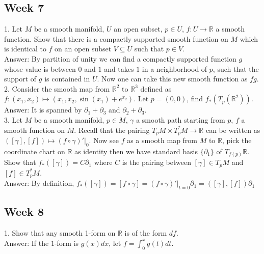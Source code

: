 \documentclass{article}
\theoremstyle{definition}
\begin{document}
\newpage

\subsection{Week 7}

1. Let $M$ be a smooth manifold, $U$ an open subset, $p\in U$, $f: U\rightarrow \mathbb{R}$ a smooth function. Show that there is a compactly supported smooth function on $M$ which is identical to $f$ on an open subset $V\subseteq U$ such that $p\in V$.\\

Answer: By partition of unity we can find a compactly supported function $g$ whose value is between $0$ and $1$ and takes $1$ in a neighborhood of $p$, such that the support of $g$ is contained in $U$. Now one can take this new smooth function as $fg$.\\

2. Consider the smooth map from $\mathbb{R}^2$ to $\mathbb{R}^3$ defined as $f: (x_1, x_2)\mapsto (x_1, x_2, \sin(x_1)+e^{x_2})$. Let $p=(0, 0)$, find $f_*(T_p(\mathbb{R}^2))$.\\

Answer: It is spanned by $\partial_1+\partial_3$ and $\partial_2+\partial_3$.\\

3. Let $M$ be a smooth manifold, $p\in M$, $\gamma$ a smooth path starting from $p$, $f$ a smooth function on $M$. Recall that the pairing $T_pM\times T^*_pM\rightarrow \mathbb{R}$ can be written as $([\gamma], [f])\mapsto (f\circ \gamma)'|_0$. Now see $f$ as a smooth map from $M$ to $\mathbb{R}$, pick the coordinate chart on $\mathbb{R}$ as identity then we have standard basis $\{\partial_1\}$ of $T_{f(p)}\mathbb{R}$. Show that
$f_*([\gamma])=C\partial_1$ where $C$ is the pairing between $[\gamma]\in T_pM$ and $[f]\in T^*_pM$.\\

Answer: By definition, $f_*([\gamma])=[f\circ\gamma]=(f\circ\gamma)'|_{t=0}\partial_1=([\gamma], [f])\partial_1$

\newpage

\subsection{Week 8}

1. Show that any smooth 1-form on $\mathbb{R}$ is of the form $df$.\\

Answer: If the $1$-form is $g(x)dx$, let $f=\int_0^x g(t)dt$.\\
\end{document}

